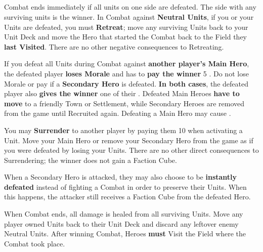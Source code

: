 \begin{multicols}{2}
\subsection*{}
Combat ends immediately if all units on one side are defeated.
The side with any surviving units is the winner.
In Combat against \textbf{Neutral Units}, if you  or your Units are defeated, you must \textbf{Retreat}; move any surviving Units back to your Unit Deck and move the Hero that started the Combat back to the Field they \textbf{last Visited}.
There are no other negative consequences to Retreating.\par
{}\par
If you defeat all Units during Combat against \textbf{another player's Main Hero}, the defeated player \textbf{loses Morale} and has to \textbf{pay the winner} 5 .
Do not lose Morale or pay  if a \textbf{Secondary Hero} is defeated.
\textbf{In both cases}, the defeated player also \textbf{gives the winner} one of their .
Defeated Main Heroes \textbf{have to move} to a friendly Town or Settlement, while Secondary Heroes are removed from the game until Recruited again.
Defeating a Main Hero may cause .\par
You may \textbf{Surrender} to another player by paying them 10  when activating a Unit.
Move your Main Hero or remove your Secondary Hero from the game as if you were defeated by losing your Units.
There are no other direct consequences to Surrendering; the winner does not gain a Faction Cube.\par
{}\par
When a Secondary Hero is attacked, they may also choose to be \textbf{instantly defeated} instead of fighting a Combat in order to preserve their Units.
When this happens, the attacker still receives a Faction Cube from the defeated Hero.\par
When Combat ends, all damage is healed from all surviving Units.
Move any player owned Units back to their Unit Deck and discard any leftover enemy Neutral Units.
After winning Combat, Heroes \textbf{must} Visit the Field where the Combat took place.


\end{multicols}
